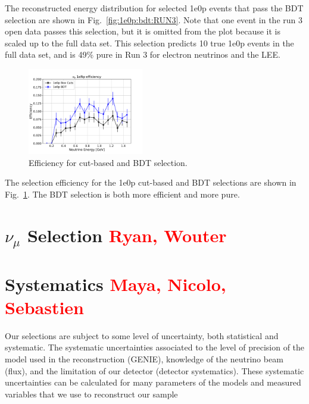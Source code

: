 \documentclass[a4paper]{article}
\begin{document}
The reconstructed energy distribution for selected 1e0p events that pass the BDT selection are shown in Fig.~\ref{fig:1e0p:bdt:RUN3}.  Note that one event in the run 3 open data passes this selection, but it is omitted from the plot because it is scaled up to the full data set.  This selection predicts 10 true 1e0p events in the full data set, and is 49\% pure in Run 3 for electron neutrinos and the LEE.

\begin{figure}[H]
\begin{center}
\includegraphics[width=0.45\textwidth]{1e0p/efficiency_RUN3.pdf}
\caption{\label{fig:1e0p:eff:RUN3} Efficiency for cut-based and BDT selection.}
\end{center}
\end{figure}

The selection efficiency for the 1e0p cut-based and BDT selections are shown in Fig.~\ref{fig:1e0p:eff:RUN3}.  The BDT selection is both more efficient and more pure. 

\clearpage
\section{$\nu_{\mu}$ Selection \textcolor{red}{Ryan, Wouter}}
\label{sec:numuselection}

\clearpage

\section{Systematics \textcolor{red}{Maya, Nicolo, Sebastien}}
\label{sec:systematics}

Our selections are subject to some level of uncertainty, both statistical and systematic. The systematic uncertainties associated to the level of precision of the model used in the reconstruction (GENIE), knowledge of the neutrino beam (flux), and the limitation of our detector (detector systematics). These systematic uncertainties can be calculated for many parameters of the models and measured variables that we use to reconstruct our sample
\end{document}
